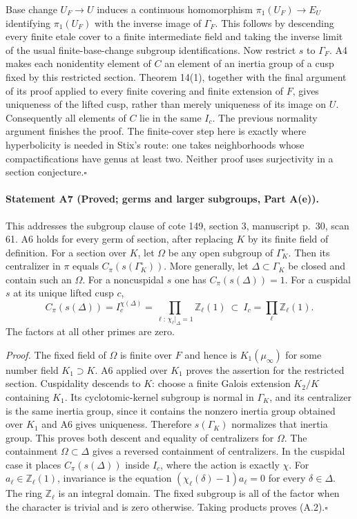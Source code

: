 Base change $U_F\to U$ induces a continuous homomorphism $\pi_1(U_F)\to E_U$ identifying $\pi_1(U_F)$ with the inverse image of $\Gamma_F$. This follows by descending every finite etale cover to a finite intermediate field and taking the inverse limit of the usual finite-base-change subgroup identifications. Now restrict $s$ to $\Gamma_F$. A4 makes each nonidentity element of $C$ an element of an inertia group of a cusp fixed by this restricted section. Theorem 14(1), together with the final argument of its proof applied to every finite covering and finite extension of $F$, gives uniqueness of the lifted cusp, rather than merely uniqueness of its image on $U$. Consequently all elements of $C$ lie in the same $I_c$. The previous normality argument finishes the proof. The finite-cover step here is exactly where hyperbolicity is needed in Stix's route: one takes neighborhoods whose compactifications have genus at least two. Neither proof uses surjectivity in a section conjecture.\hfill$\square$

\paragraph{Statement A7 (Proved; germs and larger subgroups, Part A(e)).}\label{res:A7}
This addresses the subgroup clause of cote 149, section 3, manuscript p.~30, scan 61.
A6 holds for every germ of section, after replacing $K$ by its finite field of definition. For a section over $K$, let $\Omega$ be any open subgroup of $\Gamma_K^\circ$. Then its centralizer in $\pi$ equals $C_\pi(s(\Gamma_K^\circ))$. More generally, let $\Delta\subset\Gamma_K$ be closed and contain such an $\Omega$. For a noncuspidal $s$ one has $C_\pi(s(\Delta))=1$. For a cuspidal $s$ at its unique lifted cusp $c$,
\[
 C_\pi(s(\Delta))=I_c^{\chi(\Delta)}
 =\prod_{\ell:\,\chi_\ell|_\Delta=1}\mathbb Z_\ell(1)
 \ \subset\ I_c=\prod_\ell\mathbb Z_\ell(1).\tag{A.2}
\]
The factors at all other primes are zero.

\emph{Proof.} The fixed field of $\Omega$ is finite over $F$ and hence is $K_1(\mu_\infty)$ for some number field $K_1\supset K$. A6 applied over $K_1$ proves the assertion for the restricted section. Cuspidality descends to $K$: choose a finite Galois extension $K_2/K$ containing $K_1$. Its cyclotomic-kernel subgroup is normal in $\Gamma_K$, and its centralizer is the same inertia group, since it contains the nonzero inertia group obtained over $K_1$ and A6 gives uniqueness. Therefore $s(\Gamma_K)$ normalizes that inertia group. This proves both descent and equality of centralizers for $\Omega$. The containment $\Omega\subset\Delta$ gives a reversed containment of centralizers. In the cuspidal case it places $C_\pi(s(\Delta))$ inside $I_c$, where the action is exactly $\chi$. For $a_\ell\in\mathbb Z_\ell(1)$, invariance is the equation $(\chi_\ell(\delta)-1)a_\ell=0$ for every $\delta\in\Delta$. The ring $\mathbb Z_\ell$ is an integral domain. The fixed subgroup is all of the factor when the character is trivial and is zero otherwise. Taking products proves (A.2).\hfill$\square$


